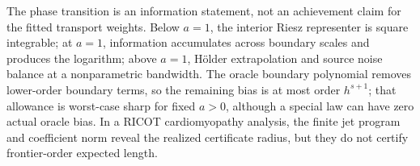 The phase transition is an information statement, not an achievement claim for the fitted transport weights. Below \(a=1\), the interior Riesz representer is square integrable; at \(a=1\), information accumulates across boundary scales and produces the logarithm; above \(a=1\), H\"older extrapolation and source noise balance at a nonparametric bandwidth. The oracle boundary polynomial removes lower-order boundary terms, so the remaining bias is at most order \(h^{s+1}\); that allowance is worst-case sharp for fixed \(a>0\), although a special law can have zero actual oracle bias. In a RICOT cardiomyopathy analysis, the finite jet program and coefficient norm reveal the realized certificate radius, but they do not certify frontier-order expected length.